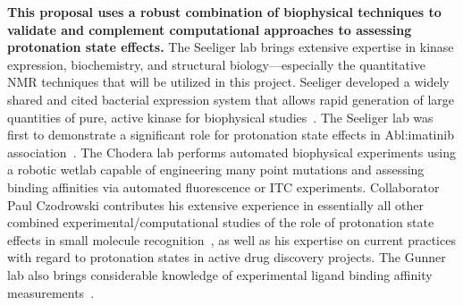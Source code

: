 \documentclass[11pt]{article}
\begin{document}

{\bf This proposal uses a robust combination of biophysical techniques to validate and complement computational approaches to assessing protonation state effects.}
The Seeliger lab brings extensive expertise in kinase expression, biochemistry, and structural biology---especially the quantitative NMR techniques that will be utilized in this project.
Seeliger developed a widely shared and cited bacterial expression system that allows rapid generation of large quantities of pure, active kinase for biophysical studies~\cite{seeliger:2005:protein-sci:kinase-expression}.
The Seeliger lab was first to demonstrate a significant role for protonation state effects in Abl:imatinib association~\cite{kuriyan-shaw:pnas:2009:abl-protonation-state}. 
The Chodera lab performs automated biophysical experiments using a robotic wetlab capable of engineering many point mutations and assessing binding affinities via automated fluorescence or ITC experiments.
Collaborator Paul Czodrowski contributes his extensive experience in essentially all other combined experimental/computational studies of the role of protonation state effects in small molecule recognition~\cite{klebe:2001:jmb:trypsin-thrombin,klebe:chembiochem:2002:ph-dependent-binding-modes,klebe:jmb:2007:protonation-state-changes,klebe:jmb:2007:factorizing-binding-affinity}, as well as his expertise on current practices with regard to protonation states in active drug discovery projects.
The Gunner lab also brings considerable knowledge of experimental ligand binding affinity measurements~\cite{dutton:biochem:1994:photosynthetic-reaction-center,gunner:proteins:2010:reaction-center,gunner:photosynth-res:2013:photosynthetic-reaction-center}.  

\eject

\end{document}
